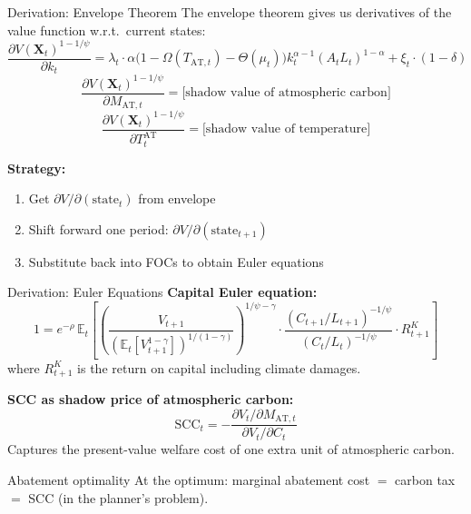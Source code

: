 \documentclass[aspectratio=169,11pt]{beamer}
\newcommand{\emphc}[1]{\textcolor{harvardcrimson}{#1}}
\newcommand{\X}{\bm{X}}
\begin{document}
\begin{frame}{Derivation: Envelope Theorem}
\small
The envelope theorem gives us derivatives of the value function w.r.t.\ \emphc{current} states:
\[
\frac{\partial V(\X_t)^{1-1/\psi}}{\partial k_t} = \lambda_t \cdot \alpha \bigl(1-\Omega(T_{\mathrm{AT},t}) - \Theta(\mu_t)\bigr) k_t^{\alpha-1}(A_t L_t)^{1-\alpha} + \xi_t \cdot (1-\delta)
\]
\[
\frac{\partial V(\X_t)^{1-1/\psi}}{\partial M_{\mathrm{AT},t}} = \text{[shadow value of atmospheric carbon]}
\]
\[
\frac{\partial V(\X_t)^{1-1/\psi}}{\partial T^{\mathrm{AT}}_t} = \text{[shadow value of temperature]}
\]

\vspace{0.2cm}
\textbf{Strategy:}
\begin{enumerate}
    \item Get $\partial V / \partial(\text{state}_t)$ from envelope
    \item Shift forward one period: $\partial V / \partial(\text{state}_{t+1})$
    \item Substitute back into FOCs to obtain \emphc{Euler equations}
\end{enumerate}
\end{frame}

\begin{frame}{Derivation: Euler Equations}
\small
\textbf{Capital Euler equation:}
\[
1 = e^{-\rho}\, \mathbb{E}_t\!\left[\left(\frac{V_{t+1}}{(\mathbb{E}_t[V_{t+1}^{1-\gamma}])^{1/(1-\gamma)}}\right)^{1/\psi - \gamma} \cdot \frac{(C_{t+1}/L_{t+1})^{-1/\psi}}{(C_t/L_t)^{-1/\psi}} \cdot R_{t+1}^K\right]
\]
where $R_{t+1}^K$ is the return on capital including climate damages.

\vspace{0.2cm}
\textbf{SCC as shadow price of atmospheric carbon:}
\[
\mathrm{SCC}_t = -\frac{\partial V_t / \partial M_{\mathrm{AT},t}}{\partial V_t / \partial C_t}
\]
Captures the present-value welfare cost of one extra unit of atmospheric carbon.

\vspace{0.2cm}
\begin{exampleblock}{Abatement optimality}
At the optimum: marginal abatement cost $=$ carbon tax $=$ SCC (in the planner's problem).
\end{exampleblock}
\end{frame}
\end{document}
